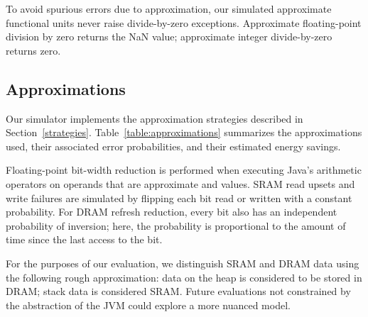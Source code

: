 To avoid spurious errors due to approximation, our simulated
approximate functional units never raise divide-by-zero exceptions. Approximate
floating-point division by zero returns the NaN value;
approximate integer divide-by-zero returns zero.



\subsection{Approximations}
Our simulator implements the approximation strategies described in
Section~\ref{strategies}. Table~\ref{table:approximations} summarizes the
approximations used, their associated error probabilities, and their
estimated energy savings.

Floating-point bit-width reduction is performed when executing Java's
arithmetic operators on operands that are approximate 
and  values. SRAM read upsets and write failures are
simulated by flipping each bit read or written with a constant
probability. For DRAM refresh reduction, every bit also has an
independent probability of inversion; here, the probability is
proportional to the amount of time since the last access to the bit.

For the purposes of our evaluation, we distinguish SRAM and DRAM data using the
following rough approximation: data on the heap is considered to be stored
in DRAM; stack data is considered SRAM\@. Future evaluations not constrained by
the abstraction of the JVM could explore a more nuanced model.

